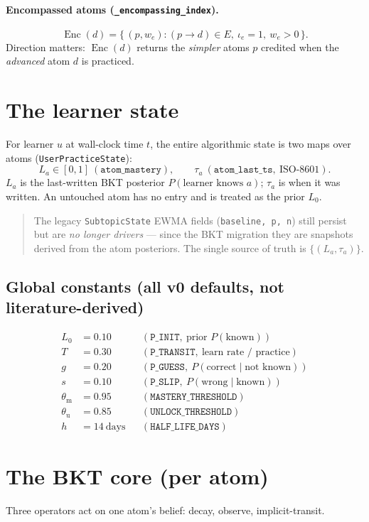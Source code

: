 \documentclass[11pt]{article}
\newcommand{\Enc}{\operatorname{Enc}}
\begin{document}
\paragraph{Encompassed atoms (\texttt{\_encompassing\_index}).}
\[
  \Enc(d) = \{\, (p, w_e) : (p\!\to\! d)\in E,\ \iota_e=1,\ w_e>0 \,\}.
\]
Direction matters: $\Enc(d)$ returns the \emph{simpler} atoms $p$ credited when
the \emph{advanced} atom $d$ is practiced.

\section{The learner state}
For learner $u$ at wall-clock time $t$, the entire algorithmic state is two maps
over atoms (\texttt{UserPracticeState}):
\[
  L_a\in[0,1]\ (\texttt{atom\_mastery}), \qquad
  \tau_a\ (\texttt{atom\_last\_ts},\ \text{ISO-8601}).
\]
$L_a$ is the last-written BKT posterior $P(\text{learner knows }a)$; $\tau_a$ is
when it was written. An untouched atom has no entry and is treated as the prior
$L_0$.

\begin{quote}\small
The legacy \texttt{SubtopicState} EWMA fields (\texttt{baseline, p, n}) still
persist but are \emph{no longer drivers} --- since the BKT migration they are
snapshots derived from the atom posteriors. The single source of truth is
$\{(L_a,\tau_a)\}$.
\end{quote}

\subsection{Global constants (all v0 defaults, not literature-derived)}
\[
\begin{aligned}
L_0 &= 0.10 &&(\texttt{P\_INIT},\ \text{prior }P(\text{known}))\\
T &= 0.30 &&(\texttt{P\_TRANSIT},\ \text{learn rate / practice})\\
g &= 0.20 &&(\texttt{P\_GUESS},\ P(\text{correct}\mid\text{not known}))\\
s &= 0.10 &&(\texttt{P\_SLIP},\ P(\text{wrong}\mid\text{known}))\\
\theta_{\mathrm{m}} &= 0.95 &&(\texttt{MASTERY\_THRESHOLD})\\
\theta_{\mathrm{u}} &= 0.85 &&(\texttt{UNLOCK\_THRESHOLD})\\
h &= 14~\text{days} &&(\texttt{HALF\_LIFE\_DAYS})
\end{aligned}
\]

\section{The BKT core (per atom)}
Three operators act on one atom's belief: decay, observe, implicit-transit.
\end{document}
